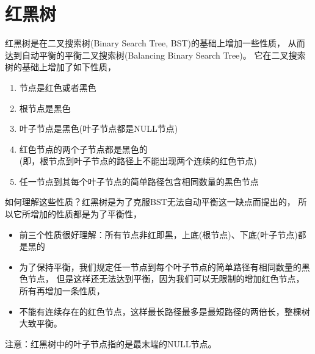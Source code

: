 ﻿\section[红黑树]{红黑树}
红黑树是在二叉搜索树(Binary Search Tree, BST)的基础上增加一些性质，
从而达到自动平衡的平衡二叉搜索树(Balancing Binary Search Tree)。
它在二叉搜索树的基础上增加了如下性质，
\begin{enumerate}
  \item 节点是红色或者黑色
  \item 根节点是黑色
  \item 叶子节点是黑色(叶子节点都是NULL节点)
  \item 红色节点的两个子节点都是黑色的\\
  (即，根节点到叶子节点的路径上不能出现两个连续的红色节点)
  \item 任一节点到其每个叶子节点的简单路径包含相同数量的黑色节点
\end{enumerate}
如何理解这些性质？红黑树是为了克服BST无法自动平衡这一缺点而提出的，
所以它所增加的性质都是为了平衡性，
\begin{itemize}
  \item 前三个性质很好理解：所有节点非红即黑，上底(根节点)、下底(叶子节点)都是黑的
  \item 为了保持平衡，我们规定任一节点到每个叶子节点的简单路径有相同数量的黑色节点，
  但是这样还无法达到平衡，因为我们可以无限制的增加红色节点，所有再增加一条性质，
  \item 不能有连续存在的红色节点，这样最长路径最多是最短路径的两倍长，整棵树大致平衡。
\end{itemize}
注意：红黑树中的叶子节点指的是最末端的NULL节点。

